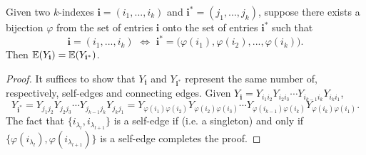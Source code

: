 \begin{lemma}
  \label{lem:equal_equiv_class_equal_expectation}
  \notready
  Given two $k$-indexes $\mathbf{i} = (i_1,...,i_k)$ and $\mathbf{i}^* = (j_1,...,j_k)$, 
  suppose there exists a bijection $\varphi$ from the set of entries $\mathbf{i}$ onto the set of entries $\mathbf{i}^*$ such that
  \[
  \mathbf{i} = (i_1,...,i_k) \,\, \Longleftrightarrow \,\, \mathbf{i}^* = \bigl( \varphi(i_1),\varphi(i_2),...,\varphi(i_k) \bigl).
  \]
  Then ${\mathbb{E}} (Y_\mathbf{i}) = {\mathbb{E}} (Y_{\mathbf{i}^*})$.
\end{lemma}
\begin{proof}
  It suffices to show that $Y_\mathbf{i}$ and $Y_{\mathbf{i}^*}$ represent the same number of, respectively, self-edges and connecting edges.
  Given $Y_\mathbf{i} = Y_{i_1 i_2}Y_{i_2 i_3} \cdots Y_{i_{k-1} i_k}Y_{i_k i_1}$,
  \[
  Y_{\mathbf{i}^*} = Y_{j_1 j_2}Y_{j_2 j_3} \cdots Y_{j_{k-1} j_k}Y_{j_k j_1} 
  = Y_{\varphi(i_1) \varphi(i_2)}Y_{\varphi(i_2) \varphi(i_3)} \cdots Y_{\varphi(i_{k-1}) \varphi(i_k)}Y_{\varphi(i_k) \varphi(i_1)}.
  \] 
  The fact that $\{ i_{\lambda_l},i_{\lambda_{l+1}} \}$ is a self-edge 
  if (i.e. a singleton) and only if $\{ \varphi(i_{\lambda_l}),\varphi(i_{\lambda_{l+1}}) \}$ is a self-edge completes the proof.
\end{proof}
